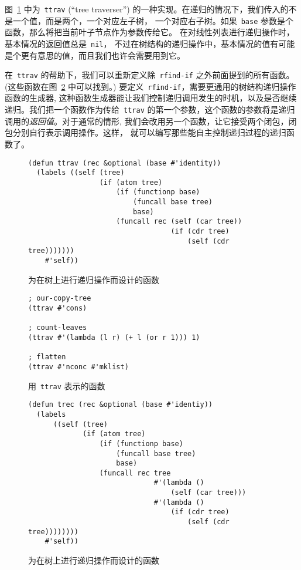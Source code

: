 图~\ref{fig:function_for_recursion_on_trees:ttrav} 中为~\texttt{ttrav} (``tree traverser'') 
的一种实现。在递归的情况下，我们传入的不是一个值，而是两个，一个对应左子树，
一个对应右子树。如果~\verb|base| 参数是个函数，那么将把当前叶子节点作为参数传给它。
在对线性列表进行递归操作时，基本情况的返回值总是~\verb|nil|，
不过在树结构的递归操作中，基本情况的值有可能是个更有意思的值，而且我们也许会需要用到它。

在~\verb|ttrav| 的帮助下，我们可以重新定义除~\verb|rfind-if| 之外前面提到的所有函数。
(这些函数在图~\ref{fig:functions_expressed_with_ttrav} 中可以找到。)
要定义~\verb|rfind-if|，需要更通用的树结构递归操作函数的生成器,
这种函数生成器能让我们控制递归调用发生的时机，以及是否继续递归。我们把一个函数作为传给~\verb|ttrav| 
的第一个参数，这个函数的参数将是递归调用的\emph{返回值}。对于通常的情形,
我们会改用另一个函数，让它接受两个闭包，闭包分别自行表示调用操作。这样，
就可以编写那些能自主控制递归过程的递归函数了。

\begin{figure}
\begin{lstlisting}
(defun ttrav (rec &optional (base #'identity))
  (labels ((self (tree)
                 (if (atom tree)
                     (if (functionp base)
                         (funcall base tree)
                         base)
                     (funcall rec (self (car tree))
                                  (if (cdr tree)
                                      (self (cdr tree)))))))
    #'self))
\end{lstlisting}
\caption{\label{fig:function_for_recursion_on_trees:ttrav}为在树上进行递归操作而设计的函数}
\end{figure}

\begin{figure}
\begin{lstlisting}
; our-copy-tree
(ttrav #'cons)

; count-leaves
(ttrav #'(lambda (l r) (+ l (or r 1))) 1)

; flatten
(ttrav #'nconc #'mklist)
\end{lstlisting}
\caption{\label{fig:functions_expressed_with_ttrav}用~\texttt{ttrav} 表示的函数}
\end{figure}

\begin{figure}
\begin{lstlisting}
(defun trec (rec &optional (base #'identiy))
  (labels
      ((self (tree)
             (if (atom tree)
                 (if (functionp base)
                     (funcall base tree)
                     base)
                 (funcall rec tree
                              #'(lambda ()
                                  (self (car tree)))
                              #'(lambda ()
                                  (if (cdr tree)
                                      (self (cdr tree))))))))
    #'self))
\end{lstlisting}
  \caption{\label{fig:function_for_recursion_on_trees:trec}为在树上进行递归操作而设计的函数}
\end{figure}

